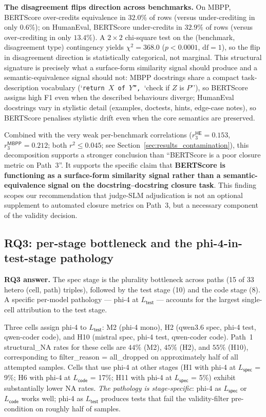 \textbf{The disagreement flips direction across benchmarks.} On MBPP, BERTScore over-credits equivalence in $32.0\%$ of rows (versus under-crediting in only $0.6\%$); on HumanEval, BERTScore under-credits in $32.9\%$ of rows (versus over-crediting in only $13.4\%$). A $2 \times 2$ chi-square test on the (benchmark, disagreement type) contingency yields $\chi^2 = 368.0$ ($p < 0.0001$, $\text{df} = 1$), so the flip in disagreement direction is statistically categorical, not marginal. This structural signature is precisely what a surface-form similarity signal should produce and a semantic-equivalence signal should not: MBPP docstrings share a compact task-description vocabulary (`\texttt{return $X$ of $Y$'', }`check if $Z$ is $P$''), so BERTScore assigns high F1 even when the described behaviours diverge; HumanEval docstrings vary in stylistic detail (examples, doctests, hints, edge-case notes), so BERTScore penalises stylistic drift even when the core semantics are preserved.

Combined with the very weak per-benchmark correlations ($r_3^{\textsf{HE}} = 0.153$, $r_3^{\textsf{MBPP}} = 0.212$; both $r^2 \leq 0.045$; see Section~\ref{sec:results_contamination}), this decomposition supports a stronger conclusion than ``BERTScore is a poor closure metric on Path~3''. It supports the specific claim that \textbf{BERTScore is functioning as a surface-form similarity signal rather than a semantic-equivalence signal on the docstring--docstring closure task}. This finding scopes our recommendation that judge-SLM adjudication is not an optional supplement to automated closure metrics on Path~3, but a necessary component of the validity decision.

\subsection{RQ3: per-stage bottleneck and the phi-4-in-test-stage pathology}

\textbf{RQ3 answer.} The spec stage is the plurality bottleneck across paths (15 of 33 hetero (cell, path) triples), followed by the test stage (10) and the code stage (8). A specific per-model pathology --- phi-4 at $L_{\textsf{test}}$ --- accounts for the largest single-cell attribution to the test stage.

Three cells assign phi-4 to $L_{\textsf{test}}$: M2 (phi-4 mono), H2 (qwen3.6 spec, phi-4 test, qwen-coder code), and H10 (mistral spec, phi-4 test, qwen-coder code). Path~1 \textsf{structural\_NA} rates for these cells are $44\%$ (M2), $45\%$ (H2), and $55\%$ (H10), corresponding to \textsf{filter\_reason} = \textsf{all\_dropped} on approximately half of all attempted samples. Cells that use phi-4 at other stages (H1 with phi-4 at $L_{\textsf{spec}}$ = 9\%; H6 with phi-4 at $L_{\textsf{code}}$ = 17\%; H11 with phi-4 at $L_{\textsf{spec}}$ = 5\%) exhibit substantially lower NA rates. \emph{The pathology is stage-specific}: phi-4 as $L_{\textsf{spec}}$ or $L_{\textsf{code}}$ works well; phi-4 as $L_{\textsf{test}}$ produces tests that fail the validity-filter pre-condition on roughly half of samples.

